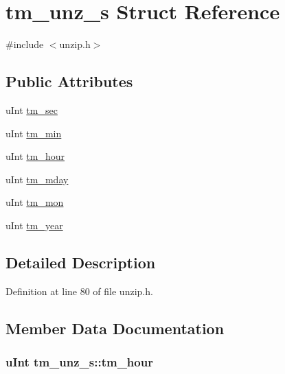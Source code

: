 \hypertarget{structtm__unz__s}{\section{tm\+\_\+unz\+\_\+s Struct Reference}
\label{structtm__unz__s}
}


{\ttfamily \#include $<$unzip.\+h$>$}

\subsection*{Public Attributes}
\begin{DoxyCompactItemize}
\item 
u\+Int \hyperlink{structtm__unz__s_ab91e69a9869e5db5be51b1aebaa5ea0d}{tm\+\_\+sec}
\item 
u\+Int \hyperlink{structtm__unz__s_ac5a6bf08a4c5db8ae2243d4f0c35b192}{tm\+\_\+min}
\item 
u\+Int \hyperlink{structtm__unz__s_ada09255f794d6c2db07ef73b77266b9c}{tm\+\_\+hour}
\item 
u\+Int \hyperlink{structtm__unz__s_a51ed1873e1dcabf08ff0f85caf8aefee}{tm\+\_\+mday}
\item 
u\+Int \hyperlink{structtm__unz__s_a4f5e461d8cad18d1aff7ec012168111d}{tm\+\_\+mon}
\item 
u\+Int \hyperlink{structtm__unz__s_a5f17147e3cfbbfdbeb2e29cbc1df8136}{tm\+\_\+year}
\end{DoxyCompactItemize}


\subsection{Detailed Description}


Definition at line 80 of file unzip.\+h.



\subsection{Member Data Documentation}
\hypertarget{structtm__unz__s_ada09255f794d6c2db07ef73b77266b9c}{
\subsubsection[{tm\+\_\+hour}]{\setlength{\rightskip}{0pt plus 5cm}u\+Int tm\+\_\+unz\+\_\+s\+::tm\+\_\+hour}}\label{structtm__unz__s_ada09255f794d6c2db07ef73b77266b9c}


